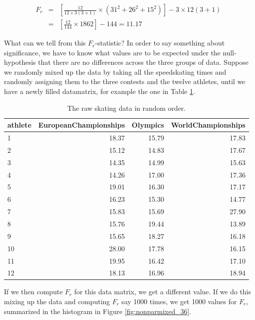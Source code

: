 \documentclass[]{book}\usepackage[]{graphicx}\usepackage[]{color}
\begin{document}
\begin{eqnarray}
F_r &=& \left[  \frac{12}{12 \times  3(3+1)} \times (31^2 + 26^2 + 15^2)      \right] - 3 \times 12 (3+1) \nonumber \\
  &=&   \left[  \frac{12}{144} \times  1862      \right] - 144 = 11.17  \nonumber
\end{eqnarray}



What can we tell from this $F_r$-statistic? In order to say something about significance, we have to know what values are to be expected under the null-hypothesis that there are no differences across the three groups of data. Suppose we randomly mixed up the data by taking all the speedskating times and randomly assigning them to the three contests and the twelve athletes, until we have a newly filled datamatrix, for example the one in Table \ref{tab:nonparmixed_26}.

\begin{table}[ht]
\centering
\caption{The raw skating data in random order.} 
\label{tab:nonparmixed_26}
\begin{tabular}{lrrr}
  \hline
athlete & EuropeanChampionships & Olympics & WorldChampionships \\ 
  \hline
1 & 18.37 & 15.79 & 17.83 \\ 
  2 & 15.12 & 14.83 & 17.67 \\ 
  3 & 14.35 & 14.99 & 15.63 \\ 
  4 & 14.26 & 17.00 & 17.36 \\ 
  5 & 19.01 & 16.30 & 17.17 \\ 
  6 & 16.23 & 15.30 & 14.77 \\ 
  7 & 15.83 & 15.69 & 27.90 \\ 
  8 & 15.76 & 19.44 & 13.89 \\ 
  9 & 15.65 & 18.27 & 16.18 \\ 
  10 & 28.00 & 17.78 & 16.15 \\ 
  11 & 19.95 & 16.42 & 17.10 \\ 
  12 & 18.13 & 16.96 & 18.94 \\ 
   \hline
\end{tabular}
\end{table}


If we then compute $F_r$ for this data matrix, we get a different value. If we do this mixing up the data and computing $F_r$ say 1000 times, we get 1000 values for $F_r$, summarized in the  histogram in Figure \ref{fig:nonparmixed_36}.
\end{document}
